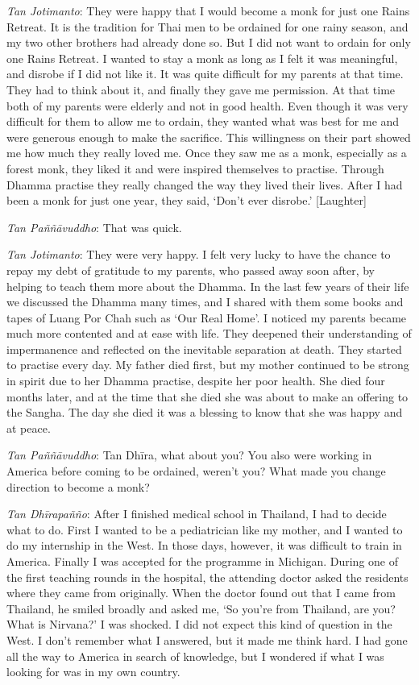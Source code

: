 \emph{Tan Jotimanto}: They were happy that I would become a monk for
just one Rains Retreat. It is the tradition for Thai men to be ordained
for one rainy season, and my two other brothers had already done so. But
I did not want to ordain for only one Rains Retreat. I wanted to stay a
monk as long as I felt it was meaningful, and disrobe if I did not like
it. It was quite difficult for my parents at that time. They had to
think about it, and finally they gave me permission. At that time both
of my parents were elderly and not in good health. Even though it was
very difficult for them to allow me to ordain, they wanted what was best
for me and were generous enough to make the sacrifice. This willingness
on their part showed me how much they really loved me. Once they saw me
as a monk, especially as a forest monk, they liked it and were inspired
themselves to practise. Through Dhamma practise they really changed the
way they lived their lives. After I had been a monk for just one year, 
they said, `Don't ever disrobe.' [Laughter]

\emph{Tan Paññāvuddho}: That was quick.

\emph{Tan Jotimanto}: They were very happy. I felt very lucky to have
the chance to repay my debt of gratitude to my parents, who passed away
soon after, by helping to teach them more about the Dhamma. In the last
few years of their life we discussed the Dhamma many times, and I shared
with them some books and tapes of Luang Por Chah such as `Our Real
Home'. I noticed my parents became much more contented and at ease with
life. They deepened their understanding of impermanence and reflected on
the inevitable separation at death. They started to practise every day. 
My father died first, but my mother continued to be strong in spirit due
to her Dhamma practise, despite her poor health. She died four months
later, and at the time that she died she was about to make an offering
to the Sangha. The day she died it was a blessing to know that she was
happy and at peace. 

\emph{Tan Paññāvuddho}: Tan Dhīra, what about you? You also were
working in America before coming to be ordained, weren't you? What made
you change direction to become a monk? 

\emph{Tan Dhīrapañño}: After I finished medical school in Thailand, I
had to decide what to do. First I wanted to be a pediatrician like my
mother, and I wanted to do my internship in the West. In those days, 
however, it was difficult to train in America. Finally I was accepted
for the programme in Michigan. During one of the first teaching rounds
in the hospital, the attending doctor asked the residents where they
came from originally. When the doctor found out that I came from
Thailand, he smiled broadly and asked me, `So you're from Thailand, are
you? What is Nirvana?' I was shocked. I did not expect this kind of
question in the West. I don't remember what I answered, but it made me
think hard. I had gone all the way to America in search of knowledge, 
but I wondered if what I was looking for was in my own country. 

